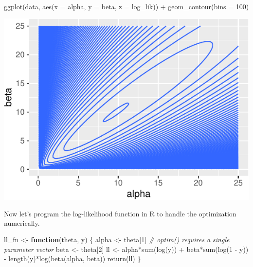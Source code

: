\documentclass[
]{book}
\newenvironment{Shaded}{\begin{snugshade}}{\end{snugshade}}
\newcommand{\AttributeTok}[1]{\textcolor[rgb]{0.77,0.63,0.00}{#1}}
\newcommand{\CommentTok}[1]{\textcolor[rgb]{0.56,0.35,0.01}{\textit{#1}}}
\newcommand{\ControlFlowTok}[1]{\textcolor[rgb]{0.13,0.29,0.53}{\textbf{#1}}}
\newcommand{\DecValTok}[1]{\textcolor[rgb]{0.00,0.00,0.81}{#1}}
\newcommand{\FunctionTok}[1]{\textcolor[rgb]{0.00,0.00,0.00}{#1}}
\newcommand{\NormalTok}[1]{#1}
\newcommand{\OtherTok}[1]{\textcolor[rgb]{0.56,0.35,0.01}{#1}}
\newcommand{\SpecialCharTok}[1]{\textcolor[rgb]{0.00,0.00,0.00}{#1}}
\begin{document}
\begin{Shaded}
\begin{Highlighting}[]
\FunctionTok{ggplot}\NormalTok{(data, }\FunctionTok{aes}\NormalTok{(}\AttributeTok{x =}\NormalTok{ alpha, }\AttributeTok{y =}\NormalTok{ beta, }\AttributeTok{z =}\NormalTok{ log\_lik)) }\SpecialCharTok{+} 
  \FunctionTok{geom\_contour}\NormalTok{(}\AttributeTok{bins =} \DecValTok{100}\NormalTok{)}
\end{Highlighting}
\end{Shaded}

\includegraphics{01-01-maximum-likelihood_files/figure-latex/unnamed-chunk-6-1.pdf}

Now let's program the log-likelihood function in R to handle the optimization numerically.

\begin{Shaded}
\begin{Highlighting}[]
\NormalTok{ll\_fn }\OtherTok{\textless{}{-}} \ControlFlowTok{function}\NormalTok{(theta, y) \{}
\NormalTok{  alpha }\OtherTok{\textless{}{-}}\NormalTok{ theta[}\DecValTok{1}\NormalTok{]  }\CommentTok{\# optim() requires a single parameter vector}
\NormalTok{  beta }\OtherTok{\textless{}{-}}\NormalTok{ theta[}\DecValTok{2}\NormalTok{]}
\NormalTok{  ll }\OtherTok{\textless{}{-}}\NormalTok{ alpha}\SpecialCharTok{*}\FunctionTok{sum}\NormalTok{(}\FunctionTok{log}\NormalTok{(y)) }\SpecialCharTok{+}\NormalTok{ beta}\SpecialCharTok{*}\FunctionTok{sum}\NormalTok{(}\FunctionTok{log}\NormalTok{(}\DecValTok{1} \SpecialCharTok{{-}}\NormalTok{ y)) }\SpecialCharTok{{-}} 
           \FunctionTok{length}\NormalTok{(y)}\SpecialCharTok{*}\FunctionTok{log}\NormalTok{(}\FunctionTok{beta}\NormalTok{(alpha, beta))}
  \FunctionTok{return}\NormalTok{(ll)}
\NormalTok{\}}
\end{Highlighting}
\end{Shaded}
\end{document}
